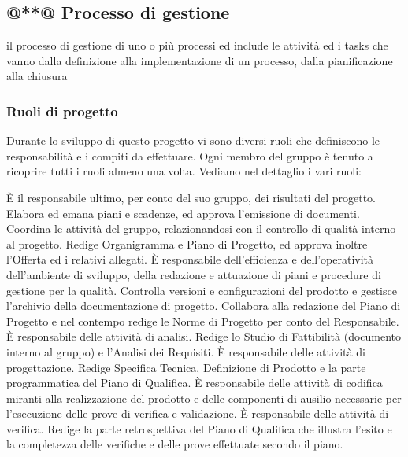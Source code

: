 \documentclass[a4paper,11pt]{article}
\begin{document}
		\subsection{@**@ Processo di gestione}
		il processo di gestione di uno o più processi ed include le
attività ed i tasks che vanno dalla definizione alla
implementazione di un processo, dalla pianificazione alla
chiusura
		\subsubsection{Ruoli di progetto}
		Durante lo sviluppo di questo progetto vi sono diversi ruoli che  definiscono le responsabilità e i compiti da effettuare. Ogni membro del gruppo è tenuto a ricoprire tutti i ruoli almeno una volta. Vediamo nel dettaglio i vari ruoli:
		
		È il responsabile ultimo, per conto del suo gruppo, dei risultati del progetto.
Elabora ed emana piani e scadenze, ed approva l'emissione di documenti. 
Coordina le attività del gruppo, relazionandosi con il controllo di qualità interno al progetto. 
Redige Organigramma e Piano di Progetto, ed approva inoltre l'Offerta ed i relativi allegati.
			È responsabile dell'efficienza e dell'operatività dell'ambiente di sviluppo, della redazione e attuazione di piani e procedure di gestione per la qualità.
Controlla versioni e configurazioni del prodotto e gestisce l'archivio della documentazione di progetto. 
Collabora alla redazione del Piano di Progetto e nel contempo redige le Norme di Progetto per conto del Responsabile.
			È responsabile delle attività di analisi. 
Redige lo Studio di Fattibilità (documento interno al gruppo) e l'Analisi dei Requisiti.
			È responsabile delle attività di progettazione. 
Redige Specifica Tecnica, Definizione di Prodotto e la parte programmatica del Piano di Qualifica.
			È responsabile delle attività di codifica miranti alla realizzazione del prodotto e delle componenti di ausilio necessarie per l'esecuzione delle prove di verifica e validazione.
			È responsabile delle attività di verifica.
Redige la parte retrospettiva del Piano di Qualifica che illustra l'esito e la completezza delle verifiche e delle prove effettuate secondo il piano.
		
				
		
\end{document}

